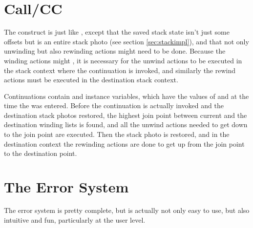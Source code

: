 \section{Call/CC}

The  construct is just like , except that
the saved stack state isn't just some offsets but is an entire stack
photo (see section \ref{sec:stackimpl}), and that not only unwinding
but also rewinding actions might need to be done.  Because the winding
actions might , it is necessary for the unwind actions to be
executed in the stack context where the continuation is invoked, and
similarly the rewind actions must be executed in the destination stack
context.


Continuations contain  and 
instance variables, which have the values of  and
 at the time the  was entered.  Before
the continuation is actually invoked and the destination stack photos
restored, the highest join point between current and the destination
winding lists is found, and all the unwind actions needed to get down
to the join point are executed.  Then the stack photo is restored, and
in the destination context the rewinding actions are done to get up
from the join point to the destination point.


\section{The Error System}

The error system is pretty complete, but is actually not only easy to
use, but also intuitive and fun, particularly at the user level.


